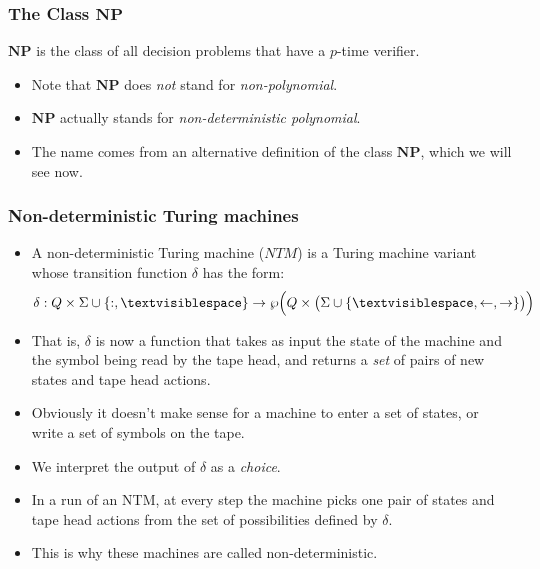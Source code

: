 \documentclass[handout]{beamer}
\newcommand{\tvs}{\textvisiblespace}
\newcommand{\ra}{\rightarrow}
\newcommand{\la}{\leftarrow}
\newcommand{\NP}{\mathbf{NP}}
\begin{document}
\begin{frame}
\frametitle{The Class $\NP$}
\begin{definition}
$\NP$ is the class of all decision problems that have a $p$-time verifier.
\end{definition}
\vspace{1cm}
\begin{itemize}   
\item Note that $\NP$ does \emph{not} stand for \emph{non-polynomial}. 
\vspace{1cm}
\item $\NP$ actually stands for \emph{non-deterministic polynomial}. 
\vspace{1cm}
\item The name comes from an alternative definition of the class $\NP$, which we will see now.
\end{itemize} 
\end{frame}


\begin{frame}
\frametitle{Non-deterministic Turing machines}
\begin{itemize}
\item A non-deterministic Turing machine ($NTM$) is a Turing machine variant whose transition function $\delta$ has the form:
\[\delta:Q\times\Sigma\cup\{:,\tvs\}\to\wp\Big(Q\times \big(\Sigma\cup\{\tvs,\la,\ra\}\big)\Big)\]
\item That is, $\delta$ is now a function that takes as input the state of the machine and the symbol being read by the tape head, and returns a \emph{set} of pairs of new states and tape head actions. 
\item Obviously it doesn't make sense for a machine to enter a set of states, or write a set of symbols on the tape.
\item We interpret the output of $\delta$ as a \emph{choice}. 
\item In a run of an NTM, at every step the machine picks one pair of states and tape head actions from the set of possibilities defined by $\delta$. 
\item This is why these machines are called non-deterministic.
\end{itemize} 
\end{frame}
\end{document}

